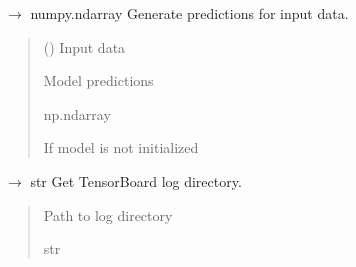 \documentclass[letterpaper,10pt,english]{sphinxmanual}
\begin{document}

\begin{fulllineitems}
\label{\detokenize{autoapi/src/CNNTrainer/index:src.CNNTrainer.predict}}
\pysigstartsignatures
\pysiglinewithargsret
{}
{}
{{ $\rightarrow$ numpy.ndarray}}
\pysigstopsignatures
\sphinxAtStartPar
Generate predictions for input data.
\begin{quote}\begin{description}
\sphinxAtStartPar
{} () \textendash{} Input data

\sphinxAtStartPar
Model predictions

\sphinxAtStartPar
np.ndarray

\sphinxAtStartPar
{} \textendash{} If model is not initialized

\end{description}\end{quote}

\end{fulllineitems}


\begin{fulllineitems}
\label{\detokenize{autoapi/src/CNNTrainer/index:src.CNNTrainer.get_log_dir}}
\pysigstartsignatures
\pysiglinewithargsret
{}
{}
{{ $\rightarrow$ str}}
\pysigstopsignatures
\sphinxAtStartPar
Get TensorBoard log directory.
\begin{quote}\begin{description}
\sphinxAtStartPar
Path to log directory

\sphinxAtStartPar
str

\end{description}\end{quote}

\end{fulllineitems}
\end{document}
